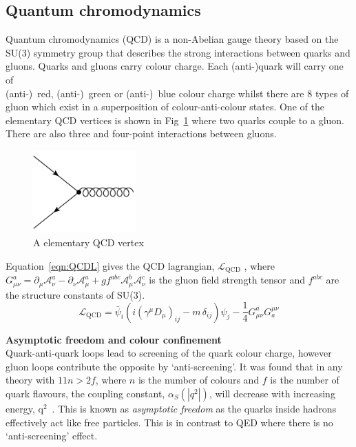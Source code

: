 \subsection{Quantum chromodynamics}

Quantum chromodynamics (QCD) is a non-Abelian gauge theory based on the SU(3) symmetry group that describes the strong interactions between quarks and gluons. Quarks and gluons carry colour charge. Each (anti-)quark will carry one of \\(anti-)~red, (anti-)~green or (anti-)~blue colour charge whilst there are 8 types of gluon which exist in a superposition of colour-anti-colour states. One of the elementary QCD vertices is shown in Fig~\ref{fig:QCDvertex} where two quarks couple to a gluon. There are also three and four-point interactions between gluons.
\label{subsec:QCD}
\begin{figure}[ht!]
\begin{center}
    \includegraphics[width=0.35\textwidth]{images/Theory/QCDvertex.png}
    \caption{A elementary QCD vertex}
    \label{fig:QCDvertex}
\end{center}
\end{figure}


Equation~\ref{eqn:QCDL} gives the QCD lagrangian, $\mathcal{L}_{\textrm {QCD}}$ , where $G_{\mu \nu }^{a}=\partial _{\mu }{\mathcal {A}}_{\nu }^{a}-\partial _{\nu }{\mathcal {A}}_{\mu }^{a}+gf^{abc}{\mathcal {A}}_{\mu }^{b}{\mathcal {A}}_{\nu }^{c}$ is the gluon field strength tensor and $f^{abc}$ are the structure constants of SU(3).
\begin{equation}
    \label{eqn:QCDL}
{\mathcal {L}}_{\mathrm {QCD} }={\bar {\psi }}_{i}\left(i(\gamma ^{\mu }D_{\mu })_{ij}-m\,\delta _{ij}\right)\psi _{j}-{\frac {1}{4}}G_{\mu \nu }^{a}G_{a}^{\mu \nu }
\end{equation}

\textbf{Asymptotic freedom and colour confinement}\\
Quark-anti-quark loops lead to screening of the quark colour charge, however gluon loops contribute the opposite by `anti-screening'. It was found that in any theory with $11n>2f$, where $n$ is the number of colours and $f$ is the number of quark flavours, the coupling constant, $\alpha_{S}\left( |q^{2}| \right)$, will decrease with increasing energy, q$^{2}$~\cite{PhysRevLett.30.1343,PhysRevLett.30.1346}. This is known as \emph{asymptotic freedom} as the quarks inside hadrons effectively act like free particles. This is in contrast to QED where there is no `anti-screening' effect.

